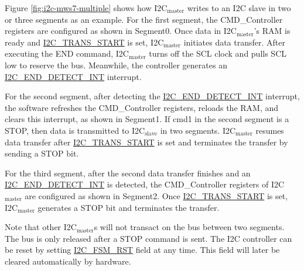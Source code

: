 \documentclass[main\_\_EN.tex]{subfiles}
\begin{document}
Figure \ref{fig:i2c-mws7-multiple} shows how I2C$_\text{master}$ writes to an I2C slave in two or three segments as an example. For the first segment, the CMD\_Controller registers are configured as shown in Segment0. Once data in I2C$_\text{master}$’s RAM is ready and \hyperref[fielddesc:I2CTRANSSTART]{I2C\_TRANS\_START} is set, I2C$_\text{master}$ initiates data transfer. After executing the END command, I2C$_\text{master}$ turns off the SCL clock and pulls SCL low to reserve the bus. Meanwhile, the controller generates an \hyperref[int:i2c-end]{I2C\_END\_DETECT\_INT} interrupt.

For the second segment, after detecting the \hyperref[int:i2c-end]{I2C\_END\_DETECT\_INT} interrupt, the software refreshes the CMD\_Controller registers, reloads the RAM, and clears this interrupt, as shown in Segment1. If cmd1 in the second segment is a STOP, then data is transmitted to I2C$_\text{slave}$ in two segments. I2C$_\text{master}$ resumes data transfer after \hyperref[fielddesc:I2CTRANSSTART]{I2C\_TRANS\_START} is set and terminates the transfer by sending a STOP bit.

For the third segment, after the second data transfer finishes and an \hyperref[int:i2c-end]{I2C\_END\_DETECT\_INT} is detected, the CMD\_Controller registers of I2C$_\text{master}$ are configured as shown in Segment2. Once \hyperref[fielddesc:I2CTRANSSTART]{I2C\_TRANS\_START} is set, I2C$_\text{master}$ generates a STOP bit and terminates the transfer. 

Note that other I2C$_\text{master}$s will not transact on the bus between two segments. The bus is only released after a STOP command is sent. The I2C controller can be reset by setting \hyperref[fielddesc:I2CFSMRST]{I2C\_FSM\_RST} field at any time. This field will later be cleared automatically by hardware.
\end{document}
